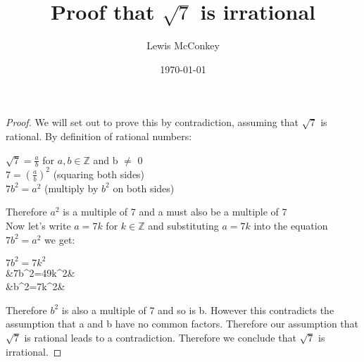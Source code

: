 \documentclass[,oneside]{article}
\author{Lewis McConkey}
\date{\today}
\title{ \LARGE{Proof that $\sqrt7$ is irrational}}
\numberwithin{equation}{section}
\newcommand{\Z}{\mathbb{Z}}
\begin{document}
\maketitle
\begin{proof}
We will set out to prove this by contradiction, assuming that $\sqrt7$ is rational. By definition of rational numbers:
\begin{center}
$\sqrt7=\frac{a}{b}$ for $a,b \in \Z$ and b $\neq$ 0\\
$7=\left( \frac{a}{b} \right)^{2}$ (squaring both sides)\\
$7b^2=a^2$ (multiply by $b^2$ on both sides)\\
\end{center}
Therefore $a^2$ is a multiple of 7 and a must also be a multiple of 7\\
Now let's write $a=7k$ for $k \in \Z$ and substituting $a=7k$ into the equation $7b^2=a^2$ we get: 
\begin{center}
$7b^2=7k^2$\\
&7b^2=49k^2&\\
&b^2=7k^2&\\
\end{center}
Therefore $b^2$ is also a multiple of 7 and so is b. However this contradicts the assumption that a and b have no common factors. Therefore our assumption that $\sqrt7$ is rational leads to a contradiction. Therefore we conclude that $\sqrt7$ is irrational. 
\end{proof}
\end{document}
